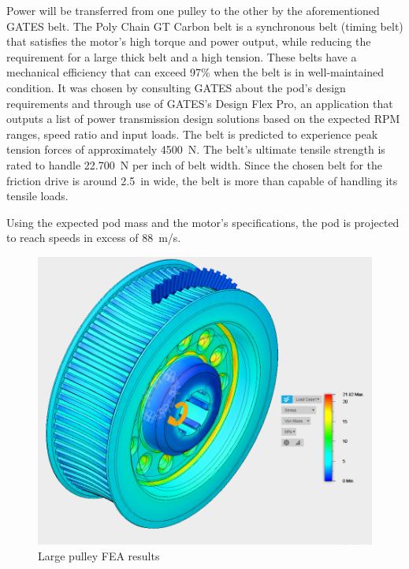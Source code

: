 \documentclass[main.tex]{subfiles}
\begin{document}
Power will be transferred from one pulley to the other by the aforementioned GATES belt. The Poly Chain GT Carbon belt is a synchronous belt (timing belt) that satisfies the motor's high torque and power output, while reducing the requirement for a large thick belt and a high tension. These belts have a mechanical efficiency that can exceed 97\% when the belt is in well-maintained condition. It was chosen by consulting GATES about the pod's design requirements and through use of GATES's Design Flex Pro, an application that outputs a list of power transmission design solutions based on the expected RPM ranges, speed ratio and input loads. The belt is predicted to experience peak tension forces of approximately \SI{4500}{N}. The belt’s ultimate tensile strength is rated to handle \SI{22,700}{N} per inch of belt width. Since the chosen belt for the friction drive is around \SI{2.5}{in} wide, the belt is more than capable of handling its tensile loads.

Using the expected pod mass and the motor's specifications, the pod is projected to reach speeds in excess of \SI{88}{m/s}.\\

	\begin{figure}
        \centering
        \includegraphics[width=0.75\linewidth]{images/pulley}
        \caption{Large pulley FEA results}
        \label{fig:pulley2}
    \end{figure}
    
\end{document}
